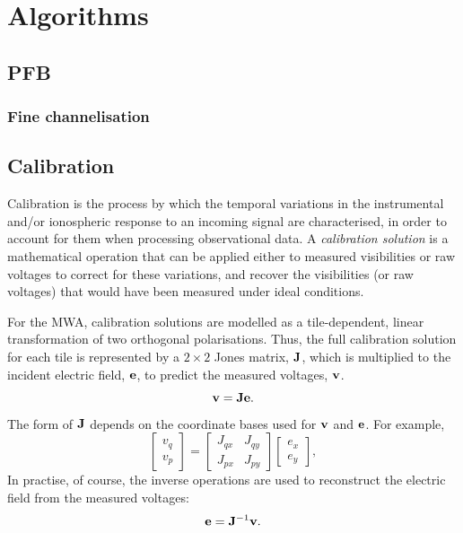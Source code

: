 \documentclass{book}
\begin{document}
\chapter{Algorithms}

\section{PFB}

\subsection{Fine channelisation}

\section{Calibration}

Calibration is the process by which the temporal variations in the instrumental and/or ionospheric response to an incoming signal are characterised, in order to account for them when processing observational data.
A \textit{calibration solution} is a mathematical operation that can be applied either to measured visibilities or raw voltages to correct for these variations, and recover the visibilities (or raw voltages) that would have been measured under ideal conditions.

For the MWA, calibration solutions are modelled as a tile-dependent, linear transformation of two orthogonal polarisations.
Thus, the full calibration solution for each tile is represented by a $2\times2$ Jones matrix, ${\bf J}$, which is multiplied to the incident electric field, ${\bf e}$, to predict the measured voltages, ${\bf v}$.
\begin{equation}
    {\bf v} = {\bf J}{\bf e}.
\end{equation}
The form of ${\bf J}$ depends on the coordinate bases used for ${\bf v}$ and ${\bf e}$.
For example,
\begin{equation}
    \begin{bmatrix} v_q \\ v_p \end{bmatrix}
        = \begin{bmatrix}
            J_{qx} & J_{qy} \\
            J_{px} & J_{py}
        \end{bmatrix}
        \begin{bmatrix} e_x \\ e_y \end{bmatrix},
\end{equation}
In practise, of course, the inverse operations are used to reconstruct the electric field from the measured voltages:
\begin{equation}
    {\bf e} = {\bf J}^{-1}{\bf v}.
\end{equation}
\end{document}
